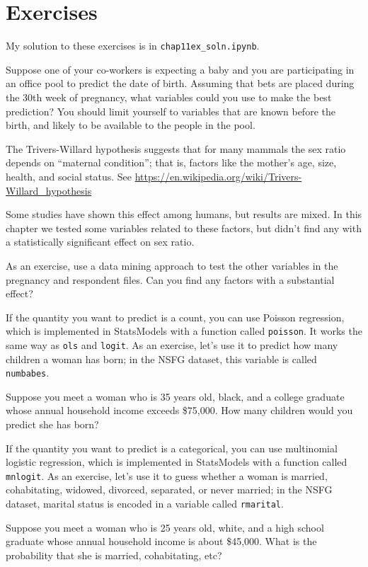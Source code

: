 \documentclass[12pt]{book}
\begin{document}
\section{Exercises}

My solution to these exercises is in \verb"chap11ex_soln.ipynb".

\begin{exercise}
Suppose one of your co-workers is expecting a baby and you are
participating in an office pool to predict the date of birth.
Assuming that bets are placed during the 30th week of pregnancy, what
variables could you use to make the best prediction?  You should limit
yourself to variables that are known before the birth, and likely to
be available to the people in the pool.
\end{exercise}


\begin{exercise}
The Trivers-Willard hypothesis suggests that for many mammals the
sex ratio depends on ``maternal condition''; that is,
factors like the mother's age, size, health, and social status.
See \url{https://en.wikipedia.org/wiki/Trivers-Willard_hypothesis}

Some studies have shown this effect among humans, but results are
mixed.  In this chapter we tested some variables related to these
factors, but didn't find any with a statistically significant effect
on sex ratio.

As an exercise, use a data mining approach to test the other variables
in the pregnancy and respondent files.  Can you find any factors with
a substantial effect?  
\end{exercise}


\begin{exercise}
If the quantity you want to predict is a count, you can use Poisson
regression, which is implemented in StatsModels with a function called
{\tt poisson}.  It works the same way as {\tt ols} and {\tt logit}.
As an exercise, let's use it to predict how many children a woman
has born; in the NSFG dataset, this variable is called {\tt numbabes}.

Suppose you meet a woman who is 35 years old, black, and a college
graduate whose annual household income exceeds \$75,000.  How many
children would you predict she has born?
\end{exercise}


\begin{exercise}
If the quantity you want to predict is a categorical, you can use
multinomial logistic regression, which is implemented in StatsModels
with a function called {\tt mnlogit}.  As an exercise, let's use it to
guess whether a woman is married, cohabitating, widowed, divorced,
separated, or never married; in the NSFG dataset, marital status is
encoded in a variable called {\tt rmarital}.

Suppose you meet a woman who is 25 years old, white, and a high
school graduate whose annual household income is about \$45,000.
What is the probability that she is married, cohabitating, etc?
\end{exercise}
\end{document}
